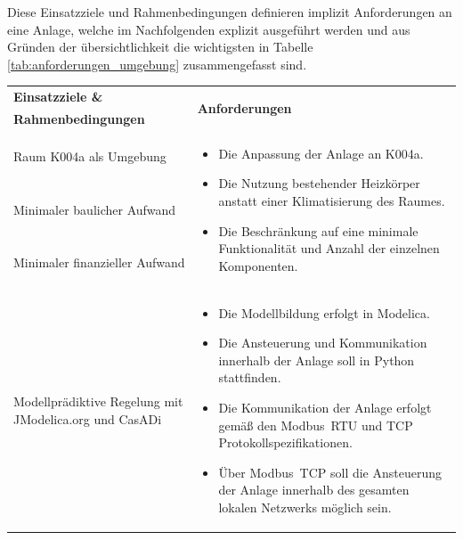 Diese Einsatzziele und Rahmenbedingungen definieren implizit Anforderungen an eine Anlage, welche im Nachfolgenden explizit ausgeführt werden und aus Gründen der übersichtlichkeit die wichtigsten in Tabelle \ref{tab:anforderungen_umgebung} zusammengefasst sind.


\begin{table}[H]
\centering
\small
\renewcommand{\arraystretch}{1.3}
\begin{tabularx}{1\textwidth}{m{}m{}}

\toprule

\textbf{Einsatzziele \&} & \multirow{2}{\hsize}{\textbf{Anforderungen}} \\ 
\textbf{Rahmenbedingungen} & \\

\cmidrule[0.5pt](r{0.25em}){1-1} 
\cmidrule[0.5pt](l{0.25em}){2-2}

Raum K004a als Umgebung  & \multirow{3}{\hsize}{
\begin{minipage}[t]{0.57\textwidth}
\begin{itemize}[itemsep=0pt,topsep=0pt,leftmargin=5mm]
	\item Die Anpassung der Anlage an K004a.
	\item Die Nutzung bestehender Heizkörper anstatt einer Klimatisierung des Raumes. 
	\item Die Beschränkung auf eine minimale Funktionalität und Anzahl der einzelnen Komponenten. 
\end{itemize}
\end{minipage}
}
 \\
	
\cmidrule[0.1pt](lr{2em}){1-1} 
Minimaler baulicher Aufwand & \\

\cmidrule[0.1pt](lr{2em}){1-1} 
Minimaler finanzieller \newline Aufwand &\\ 



\cmidrule[0.5pt](r{0.25em}){1-1} 
\cmidrule[0.5pt](l{0.25em}){2-2}

\addlinespace[4mm] Modellprädiktive Regelung mit JModelica.org und CasADi \newline & \multirow{3}{\hsize}{
\begin{minipage}[t]{0.57\textwidth}
\begin{itemize}[itemsep=0pt,topsep=0pt,leftmargin=5mm]
\item Die Modellbildung erfolgt in Modelica.
\item Die Ansteuerung und Kommunikation innerhalb der Anlage soll in Python stattfinden.
\item Die Kommunikation der Anlage erfolgt gemäß den Modbus~RTU und TCP Protokollspezifikationen.
\item Über Modbus~TCP soll die Ansteuerung der Anlage innerhalb des gesamten lokalen Netzwerks möglich sein.
\end{itemize}
\end{minipage}
}  \\


\end{tabularx}
\end{table}

